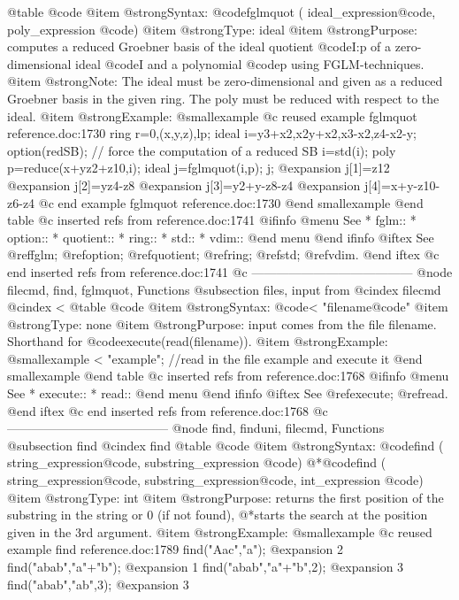 @table @code
@item @strong{Syntax:}
@code{fglmquot (} ideal_expression@code{,} poly_expression @code{)}
@item @strong{Type:}
ideal
@item @strong{Purpose:}
computes a reduced Groebner basis of the ideal quotient @code{I:p} of
a zero-dimensional ideal @code{I} and a polynomial @code{p} using
FGLM-techniques.
@item @strong{Note:}
The ideal must be zero-dimensional and given as a reduced Groebner
basis in the given ring. The poly must be reduced with respect to the
ideal.
@item @strong{Example:}
@smallexample
@c reused example fglmquot reference.doc:1730 
  ring r=0,(x,y,z),lp;
  ideal i=y3+x2,x2y+x2,x3-x2,z4-x2-y;
  option(redSB);   // force the computation of a reduced SB
  i=std(i);
  poly p=reduce(x+yz2+z10,i);
  ideal j=fglmquot(i,p);
  j;
@expansion{} j[1]=z12
@expansion{} j[2]=yz4-z8
@expansion{} j[3]=y2+y-z8-z4
@expansion{} j[4]=x+y-z10-z6-z4
@c end example fglmquot reference.doc:1730
@end smallexample
@end table
@c inserted refs from reference.doc:1741
@ifinfo
@menu
See
* fglm::
* option::
* quotient::
* ring::
* std::
* vdim::
@end menu
@end ifinfo
@iftex
See
@ref{fglm};
@ref{option};
@ref{quotient};
@ref{ring};
@ref{std};
@ref{vdim}.
@end iftex
@c end inserted refs from reference.doc:1741
@c ---------------------------------------
@node filecmd, find, fglmquot, Functions
@subsection files, input from
@cindex filecmd
@cindex <
@table @code
@item @strong{Syntax:}
@code{< "}filename@code{"}
@item @strong{Type:}
none
@item @strong{Purpose:}
input comes from the file filename. Shorthand for
@code{execute(read(filename))}.
@item @strong{Example:}
@smallexample
< "example"; //read in the file example and execute it
@end smallexample
@end table
@c inserted refs from reference.doc:1768
@ifinfo
@menu
See
* execute::
* read::
@end menu
@end ifinfo
@iftex
See
@ref{execute};
@ref{read}.
@end iftex
@c end inserted refs from reference.doc:1768
@c ---------------------------------------
@node find, finduni, filecmd, Functions
@subsection find
@cindex find
@table @code
@item @strong{Syntax:}
@code{find (} string_expression@code{,} substring_expression @code{)}
@*@code{find (} string_expression@code{,} substring_expression@code{,} int_expression @code{)}
@item @strong{Type:}
int
@item @strong{Purpose:}
returns the first position of the substring
in the string or 0 (if not found),
@*starts the search at the position given in the 3rd argument.
@item @strong{Example:}
@smallexample
@c reused example find reference.doc:1789 
  find("Aac","a");
@expansion{} 2
  find("abab","a"+"b");
@expansion{} 1
  find("abab","a"+"b",2);
@expansion{} 3
  find("abab","ab",3);
@expansion{} 3
